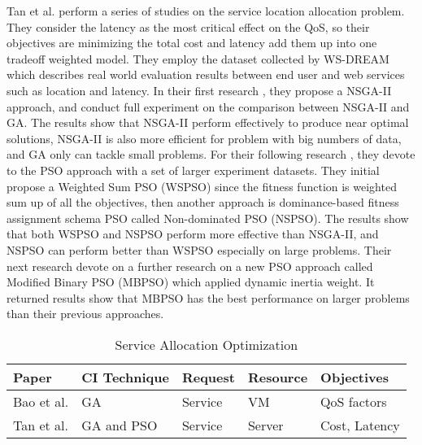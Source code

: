 \documentclass[onecolumn,10pt]{asme2ej}
\begin{document}
Tan et al. \cite{tan2016optimization, tan2016particle, tan2017binary} perform a series of studies on the service location allocation problem. They consider the latency as the most critical effect on the QoS, so their objectives are minimizing the total cost and latency add them up into one tradeoff weighted model. They employ the dataset collected by WS-DREAM \cite{zheng2014investigating, zheng2010distributed} which describes real world evaluation results between end user and web services such as location and latency. In their first research \cite{tan2016optimization}, they propose a NSGA-II approach, and conduct full experiment on the comparison between NSGA-II and GA. The results show that NSGA-II perform effectively to produce near optimal solutions, NSGA-II is also more efficient for problem with big numbers of data, and GA only can tackle small problems. For their following research \cite{tan2016particle}, they devote to the PSO approach with a set of larger experiment datasets. They initial propose a Weighted Sum PSO (WSPSO) since the fitness function is weighted sum up of all the objectives, then another approach is dominance-based fitness assignment schema PSO called Non-dominated PSO (NSPSO). The results show that both WSPSO and NSPSO perform more effective than NSGA-II, and NSPSO can perform better than WSPSO especially on large problems. Their next research \cite{tan2017binary} devote on a further research on a new PSO approach called Modified Binary PSO (MBPSO) which applied dynamic inertia weight. It returned results show that MBPSO has the best performance on larger problems than their previous approaches. 

\begin{table}[H]
\begin{center}
\begin{tabular}{|l|llll}
\rowcolor[gray]{.4}
\color{white}Paper    							  & \color{white}CI Technique & \color{white}Request     & \color{white}Resource    &\color{white}Objectives  \\ \hline 
Bao et al. \cite{bao2016orthogonal}				  & GA       				  & Service  				 & VM 						& QoS factors	\\ \hline
Tan et al. \cite{tan2016optimization,tan2016particle, tan2017binary}  & GA and PSO  	& Service        & Server                   &Cost, Latency  \\
\end{tabular}
\end{center}
\caption{Service Allocation Optimization}
\label{Service}
\end{table}
\end{document}
